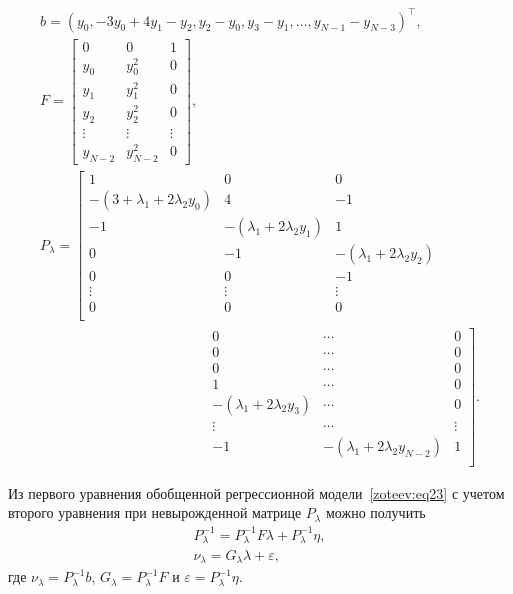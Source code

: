 \begin{itemize}
\begin{gather}
b=(y_0,-3y_0+4y_1-y_2, y_2-y_0,y_3-y_1,\dots,y_{N-1}-y_{N-3})^{\top},
\\
F=\begin{bmatrix}
0 & 0 & 1 \\
y_0 & y_0^2 & 0 \\
y_1 & y_1^2 & 0 \\
y_2 & y_2^2 & 0 \\
\vdots & \vdots & \vdots \\
y_{N-2} & y_{N-2}^2 & 0 
\end{bmatrix},
\\
P_\lambda=
\left[
\begin{array}{ccc}
1 & 0 & 0  \\
-(3+\lambda_1+2\lambda_2y_0) & 4 & -1  \\
-1 & -(\lambda_1+2\lambda_2y_1) & 1\\
0 & -1 & -(\lambda_1+2\lambda_2y_2)  \\
0 & 0 & -1  \\
\vdots & \vdots & \vdots  \\
0 & 0 & 0 \\
\end{array}\right.
\hspace{1cm}
\label{zoteev:eq27}
\\
\hspace{5cm}
\left.
\begin{array}{ccc} 
0 & \cdots & 0 \\
  0 & \cdots & 0 \\
  0 & \cdots & 0 \\
  1 & \cdots & 0 \\
  -(\lambda_1+2\lambda_2y_3) & \cdots & 0 \\
   \vdots & \cdots & \vdots \\ 
  -1 & -(\lambda_1+2\lambda_2y_{N-2}) & 1\\
\end{array}\right].
\end{gather}

\end{itemize}

\smallskip


Из первого уравнения обобщенной регрессионной модели~\eqref{zoteev:eq23} с учетом второго уравнения при невырожденной матрице $P_\lambda$ можно получить
\begin{gather}
P_\lambda^{-1}=P_\lambda^{-1}F\lambda+P_\lambda^{-1}\eta,
\\
\nu_\lambda=G_\lambda \lambda+\varepsilon,
\end{gather}
где $\nu_\lambda=P_\lambda^{-1}b$, $G_\lambda=P_\lambda^{-1}F$ и $\varepsilon=P_\lambda^{-1}\eta$.

